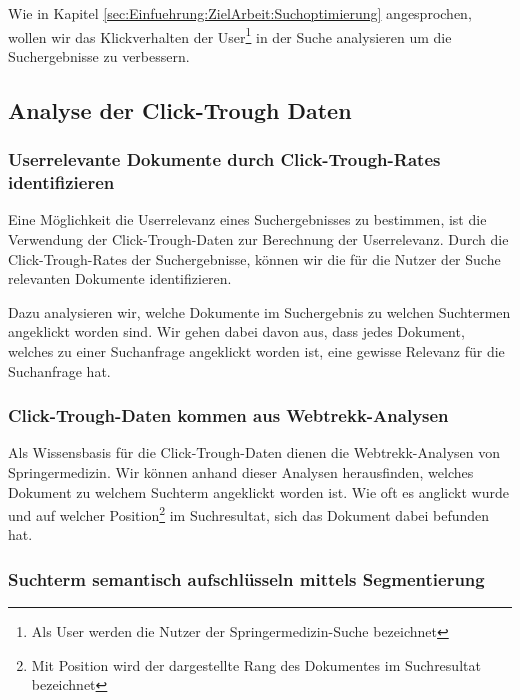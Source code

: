 Wie in Kapitel \ref{sec:Einfuehrung:ZielArbeit:Suchoptimierung} angesprochen, wollen wir das Klickverhalten der User\footnote{Als User werden die Nutzer der Springermedizin-Suche bezeichnet} in der Suche analysieren um die Suchergebnisse zu verbessern.

\subsection{Analyse der Click-Trough Daten}
\label{sec:Einfuehrung:Methodik:Click-Trough-Daten}

\subsubsection{Userrelevante Dokumente durch Click-Trough-Rates identifizieren}
\label{sec:Einfuehrung:Methodik:Click-Trough-Daten:UserrelevanteDokumente}

Eine Möglichkeit die Userrelevanz eines Suchergebnisses zu bestimmen, ist die Verwendung der Click-Trough-Daten zur Berechnung der Userrelevanz. Durch die Click-Trough-Rates der Suchergebnisse, können wir die für die Nutzer der Suche relevanten Dokumente identifizieren.

Dazu analysieren wir, welche Dokumente im Suchergebnis zu welchen Suchtermen angeklickt worden sind. Wir gehen dabei davon aus, dass jedes Dokument, welches zu einer Suchanfrage angeklickt worden ist, eine gewisse Relevanz für die Suchanfrage hat.

\subsubsection{Click-Trough-Daten kommen aus Webtrekk-Analysen}
\label{sec:Einfuehrung:Methodik:Click-Trough-Daten:Click-Trough-DatenWebtrekk-Analysen}

Als Wissensbasis für die Click-Trough-Daten dienen die Webtrekk-Analysen von Springermedizin. Wir können anhand dieser Analysen herausfinden, welches Dokument zu welchem Suchterm angeklickt worden ist. Wie oft es anglickt wurde und auf welcher Position\footnote{Mit Position wird der dargestellte Rang des Dokumentes im Suchresultat bezeichnet} im Suchresultat, sich das Dokument dabei befunden hat. 

\subsubsection{Suchterm semantisch aufschlüsseln mittels Segmentierung}
\label{sec:Einfuehrung:Methodik:Click-Trough-Daten:SuchtermSegmentierung}

